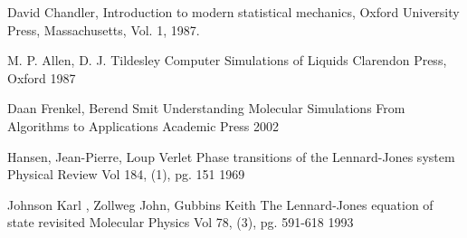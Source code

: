 \documentclass[a4paper,12pt]{article}
\begin{document}
\begin{thebibliography}{9}

  David Chandler,
  Introduction to modern statistical mechanics,
  Oxford University Press, Massachusetts,
  Vol. 1,
  1987.

  M. P. Allen, D. J. Tildesley
  Computer Simulations of Liquids
  Clarendon Press, Oxford
  1987

  Daan Frenkel, Berend Smit
  Understanding Molecular Simulations From Algorithms to Applications
  Academic Press
  2002
  
   Hansen, Jean-Pierre, Loup Verlet
   Phase transitions of the Lennard-Jones system
   Physical Review
   Vol 184, (1), pg. 151
   1969
   
   Johnson Karl , Zollweg John, Gubbins Keith  
   The Lennard-Jones equation of state revisited
   Molecular Physics
   Vol 78, (3), pg. 591-618
   1993
\end{thebibliography}
\end{document}
